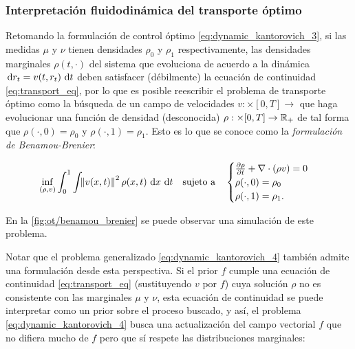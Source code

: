 \subsubsection{Interpretación fluidodinámica del transporte óptimo}

Retomando la formulación de control óptimo \eqref{eq:dynamic_kantorovich_3}, si las medidas $\mu$ y $\nu$ tienen densidades $\rho_0$ y $\rho_1$ respectivamente, las densidades marginales $\rho(t,\cdot)$ del sistema que evoluciona de acuerdo a la dinámica $\,\operatorname{d}\! r_t = v(t,r_t)\,\operatorname{d}\! t$ deben satisfacer (débilmente) la ecuación de continuidad \eqref{eq:transport_eq}, por lo que  es posible reescribir el problema de transporte óptimo como la búsqueda de un campo de velocidades $v:\xspace\times[0,T]\to\xspace$ que haga evolucionar una función de densidad (desconocida) $\rho:\times[0,T]\to\mathbb{R}_+$ de tal forma que $\rho(\cdot,0)=\rho_0$ y $\rho(\cdot,1)=\rho_1$. Esto es lo que se conoce como la \textit{formulación de Benamou-Brenier}:

\begin{equation}
	\label{eq:benamou_brenier}
	\inf_{(\rho,v)} \int_0^1 \int_{} \left\lVert v(x,t) \right\rVert^2 \rho(x,t) \,\operatorname{d}\! x\,\operatorname{d}\! t
	\quad \text{sujeto a} \quad
	\begin{cases}
		\frac{\partial \rho}{\partial t} + \nabla\cdot(\rho v) = 0\\
		\rho(\cdot,0) = \rho_0\\
		\rho(\cdot,1) = \rho_1 .
	\end{cases}
\end{equation}

En la \autoref{fig:ot/benamou_brenier} se puede observar una simulación de este problema.


Notar que el problema generalizado \eqref{eq:dynamic_kantorovich_4} también admite una formulación desde esta perspectiva. Si el prior $f$ cumple una ecuación de continuidad \eqref{eq:transport_eq} (sustituyendo $v$ por $f$) cuya solución $\rho$ no es consistente con las marginales $\mu$ y $\nu$, esta ecuación de continuidad se puede interpretar como un prior sobre el proceso buscado, y así, el problema \eqref{eq:dynamic_kantorovich_4} busca una actualización del campo vectorial $f$ que no difiera mucho de $f$ pero que sí respete las distribuciones marginales:

